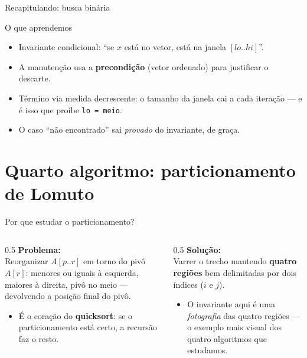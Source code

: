 \documentclass[aspectratio=169]{beamer}
\begin{document}
\begin{frame}{Recapitulando: busca binária}
  \begin{block}{O que aprendemos}
    \begin{itemize}
      \item Invariante condicional: ``se $x$ está no vetor, está na janela $[lo..hi]$''.
      \item A manutenção usa a \textbf{precondição} (vetor ordenado) para justificar o descarte.
      \item Término via medida decrescente: o tamanho da janela cai a cada iteração ---
        e é isso que proíbe \texttt{lo = meio}.
      \item O caso ``não encontrado'' sai \emph{provado} do invariante, de graça.
    \end{itemize}
  \end{block}
\end{frame}

\section{Quarto algoritmo: particionamento de Lomuto}

\begin{frame}{Por que estudar o particionamento?}
  \begin{columns}[T]
    \begin{column}{0.5\textwidth}
      \textbf{Problema:}\\[2pt]
      Reorganizar $A[p..r]$ em torno do pivô $A[r]$: menores ou iguais à esquerda,
      maiores à direita, pivô no meio --- devolvendo a posição final do pivô.
      \begin{itemize}
        \item É o coração do \textbf{quicksort}: se o particionamento está certo,
          a recursão faz o resto.
      \end{itemize}
    \end{column}
    \begin{column}{0.5\textwidth}
      \textbf{Solução:}\\[2pt]
      Varrer o trecho mantendo \textbf{quatro regiões} bem delimitadas por dois
      índices ($i$ e $j$).
      \begin{itemize}
        \item O invariante aqui é uma \emph{fotografia} das quatro regiões ---
          o exemplo mais visual dos quatro algoritmos que estudamos.
      \end{itemize}
    \end{column}
  \end{columns}
\end{frame}
\end{document}

